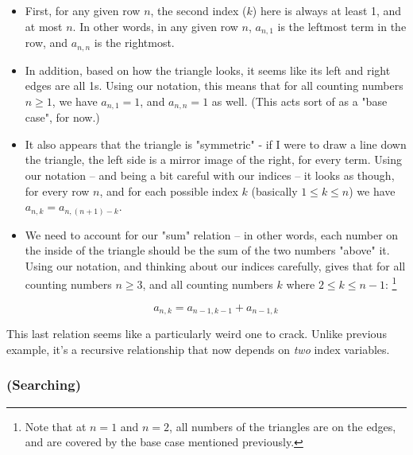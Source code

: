 \begin{itemize}
\item First, for any given row $n$, the second index ($k$) here is always at least 1, and at most $n$. In other words, in any given row $n$, $a_{n,1}$ is the leftmost term in the row, and $a_{n,n}$ is the rightmost. 
\item In addition, based on how the triangle looks, it seems like its left and right edges are all 1s. Using our notation, this means that for all counting numbers $n \geq 1$, we have $a_{n,1} = 1$, and $a_{n,n} = 1$ as well. (This acts sort of as a "base case", for now.)
\item It also appears that the triangle is "symmetric" - if I were to draw a line down the triangle, the left side is a mirror image of the right, for every term. Using our notation -- and being a bit careful with our indices -- it looks as though, for every row $n$, and for each possible index $k$ (basically $1 \leq k \leq n$) we have $a_{n,k} = a_{n,(n+1) - k}$. 

\item We need to account for our "sum" relation -- in other words, each number on the inside of the triangle should be the sum of the two numbers "above" it. Using our notation, and thinking about our indices carefully, gives that for all counting numbers $n \geq 3$, and all counting numbers $k$ where $2 \leq k \leq n-1$: \footnote{Note that at $n = 1$ and $n = 2$, all numbers of the triangles are on the edges, and are covered by the base case mentioned previously.}


\begin{equation}
\label{ex:pascal-rule-mys}
a_{n,k} = a_{n-1,k-1} + a_{n-1,k}
\end{equation}
\end{itemize}

This last relation seems like a particularly weird one to crack. Unlike previous example, it's a recursive relationship that now depends on \emph{two} index variables.

\subsubsection{(Searching)} 

